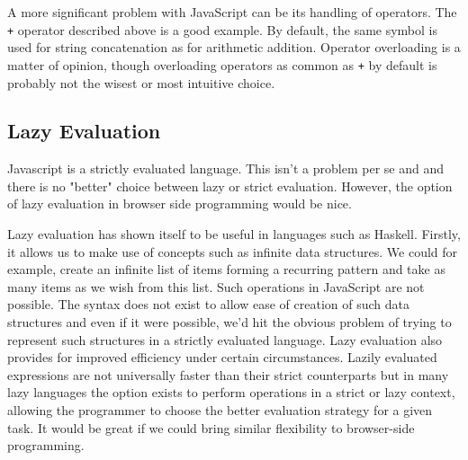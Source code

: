 A more significant problem with JavaScript can be its handling of
operators. The \verb!+! operator described above is a good
example. By default, the same symbol is used for string concatenation
as for arithmetic addition. Operator overloading is a matter of opinion,
though overloading operators as common as \verb!+! by default is probably
not the wisest or most intuitive choice. 

\subsection{Lazy Evaluation}
Javascript is a strictly evaluated language. This isn't a problem per
se and and there is no "better" choice between lazy or strict evaluation.
However, the option of lazy evaluation in browser side programming would
be nice. 

Lazy evaluation has shown itself to be useful in languages such as
Haskell. Firstly, it allows us to make use of concepts such as infinite
data structures. We could for example, create an infinite list of items
forming a recurring pattern and take as many items as we wish from this
list. Such operations in JavaScript are not possible. The syntax does
not exist to allow ease of creation of such data structures and even if
it were possible, we'd hit the obvious problem of trying to represent
such structures in a strictly evaluated language. Lazy evaluation also
provides for improved efficiency under certain circumstances. Lazily
evaluated expressions are not universally faster than their strict
counterparts but in many lazy languages the option exists to perform
operations in a strict or lazy context, allowing the programmer to choose
the better evaluation strategy for a given task. It would be great if
we could bring similar flexibility to browser-side programming.



